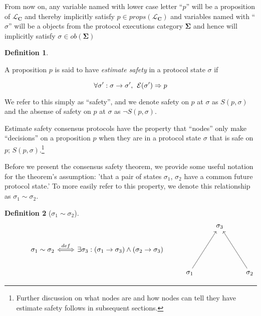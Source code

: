 \documentclass{article}
\theoremstyle{definition}
\newtheorem{defn}{Definition}[section]
\newcommand{\cat}{
	\mathbf
}
\begin{document}
From now on, any variable named with lower case letter ``$p$'' will be a proposition of $\mathcal{L}_\cat{C}$ and thereby implicitly satisfy $p \in props(\mathcal{L}_\cat{C})$ and variables named with ``$\sigma$'' will be a objects from the protocol executions category $\cat{\Sigma}$ and hence will implicitly satisfy $\sigma \in ob(\cat{\Sigma})$

\vspace{5mm}

\begin{defn}
\begin{description}
A proposition $p$ is said to have \emph{estimate safety} in a protocol state $\sigma$ if

$$
\forall \sigma':\sigma \to \sigma',\hspace{1.5mm} \mathcal{E}(\sigma') \Rightarrow p
$$
\end{description}
\end{defn}

We refer to this simply as ``safety'', and we denote safety on $p$ at $\sigma$ as $S(p,\sigma)$ and the absense of safety on $p$ at $\sigma$ as $\neg{S(p,\sigma)}$.

Estimate safety consensus protocols have the property that ``nodes'' only make ``decisions'' on a proposition $p$ when they are in a protocol state $\sigma$ that is safe on $p$; $S(p,\sigma)$.\footnote{Further discussion on what nodes are and how nodes can tell they have estimate safety follows in subsequent sections.}

Before we present the consensus safety theorem, we provide some useful notation for the theorem's assumption: 'that a pair of states $\sigma_1$, $\sigma_2$ have a common future protocol state.' To more easily refer to this property, we denote this relationship as $\sigma_1 \sim \sigma_2$.

\begin{defn}[$\sigma_1 \sim \sigma_2$]
\begin{equation*}
\begin{tikzcd}
{}
  &
{}
  &
{}
  &
{}
  &
\sigma_3
  &
{}
  \\
{}
  &
\sigma_1 \sim \sigma_2
  \arrow[r,Leftrightarrow, "def"]
  &
\exists \sigma_3:(\sigma_1 \to \sigma_3) \land (\sigma_2 \to \sigma_3)
  &
{}
  &
{}
  &
{}
  \\
{}
  &
{}
  &
{}
  &
\sigma_1
  \arrow[uur,""]
  &
{}
  &
\sigma_2
  \arrow[uul,""]
\end{tikzcd}
\end{equation*}
\end{defn}
\end{document}
